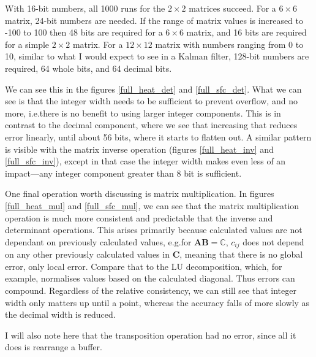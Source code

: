 \documentclass[12pt]{article}
\begin{document}


With 16-bit numbers, all 1000 runs for the $2\times2$ matrices succeed. For a $6\times6$ matrix, 24-bit numbers are needed. If the range of matrix values is increased to -100 to 100 then 48 bits are required for a $6\times6$ matrix, and 16 bits are required for a simple $2\times2$ matrix. For a $12\times12$ matrix with numbers ranging from 0 to 10, similar to what I would expect to see in a Kalman filter, 128-bit numbers are required, 64 whole bits, and 64 decimal bits.

We can see this in the figures \ref{full_heat_det} and \ref{full_sfc_det}. What we can see is that the integer width needs to be sufficient to prevent overflow, and no more, i.e.\@ there is no benefit to using larger integer components. This is in contrast to the decimal component, where we see that increasing that reduces error linearly, until about 56 bits, where it starts to flatten out. A similar pattern is visible with the matrix inverse operation (figures  \ref{full_heat_inv} and \ref{full_sfc_inv}), except in that case the integer width makes even less of an impact---any integer component greater than 8 bit is sufficient.

One final operation worth discussing is matrix multiplication. In figures \ref{full_heat_mul} and \ref{full_sfc_mul}, we can see that the matrix multiplication operation is much more consistent and predictable that the inverse and determinant operations. This arises primarily because calculated values are not dependant on previously calculated values, e.g.\@ for $\mathbf{AB}=\mathbb{C}$, $c_{ij}$ does not depend on any other previously calculated values in $\mathbf{C}$, meaning that there is no global error, only local error. Compare that to the LU decomposition, which, for example, normalises values based on the calculated diagonal. Thus errors can compound. Regardless of the relative consistency, we can still see that integer width only matters up until a point, whereas the accuracy falls of more slowly as the decimal width is reduced.

I will also note here that the transposition operation had no error, since all it does is rearrange a buffer.
\end{document}
